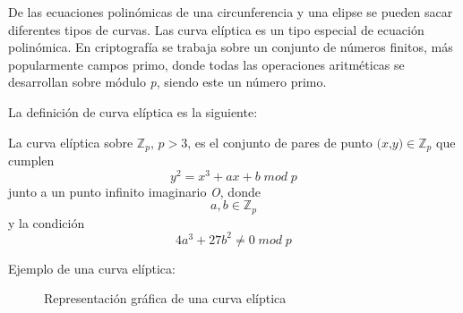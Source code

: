 De las ecuaciones polinómicas de una circunferencia y una elipse se pueden sacar diferentes tipos de curvas. Las curva elíptica
es un tipo especial de ecuación polinómica. En criptografía se trabaja sobre un conjunto de números finitos, más popularmente
campos primo, donde todas las operaciones aritméticas se desarrollan sobre módulo \textit{p}, siendo este un número primo.

La definición de curva elíptica es la siguiente:


\begin{definition}
    La curva elíptica sobre $\mathbb{Z}_{p}$, $\textit{p} > 3$, es el conjunto de pares de punto $\textit{(x,y)} \in \mathbb{Z}_{p}$ 
    que cumplen 
    \begin{equation}
        y^2 = x^3 + ax + b \; mod \; p
    \end{equation}
    junto a un punto infinito imaginario \textit{O}, donde 
    \begin{equation}
        a, b \in \mathbb{Z}_{p}
    \end{equation} 
    y la condición
    \begin{equation}
        4a^3 + 27b^2 \not = 0 \; mod \; p
    \end{equation}
\end{definition}

Ejemplo de una curva elíptica:

\begin{figure}[H]
    \caption{Representación gráfica de una curva elíptica}
\end{figure}

